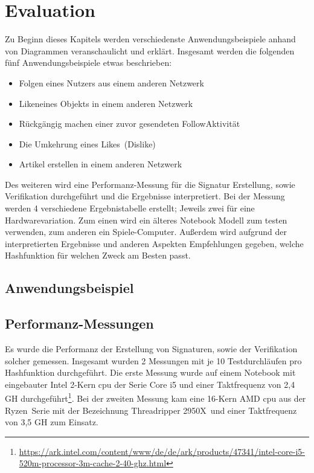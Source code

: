
\chapter{Evaluation}
\label{ch:Evaluation}
Zu Beginn dieses Kapitels werden verschiedenste Anwendungsbeispiele anhand von Diagrammen veranschaulicht und erklärt. Insgesamt werden die folgenden fünf Anwendungsbeispiele etwas beschrieben:
\begin{itemize}
	\item Folgen eines Nutzers aus einem anderen Netzwerk
	\item \glqq Liken\grqq eines Objekts in einem anderen Netzwerk
	\item Rückgängig machen einer zuvor gesendeten \glqq Follow\grqq Aktivität
	\item Die Umkehrung eines \glqq Likes\grqq~(Dislike)
	\item Artikel erstellen in einem anderen Netzwerk
\end{itemize}
Des weiteren wird eine Performanz-Messung für die Signatur Erstellung, sowie Verifikation durchgeführt und die Ergebnisse interpretiert. Bei der Messung werden 4 verschiedene Ergebnistabelle erstellt; Jeweils zwei für eine Hardwarevariation. Zum einen wird ein älteres Notebook Modell zum testen verwenden, zum anderen ein Spiele-Computer. Außerdem wird aufgrund der interpretierten Ergebnisse und anderen Aspekten Empfehlungen gegeben, welche Hashfunktion für welchen Zweck am Besten passt.
\section{Anwendungsbeispiel}
\section{Performanz-Messungen}
Es wurde die Performanz der Erstellung von Signaturen, sowie der Verifikation solcher gemessen. Insgesamt wurden 2 Messungen mit je 10 Testdurchläufen pro Hashfunktion durchgeführt. Die erste Messung wurde auf einem Notebook mit eingebauter Intel 2-Kern \gls{cpu} der Serie Core i5 und einer Taktfrequenz von 2,4 GH durchgeführt\footnote{\url{https://ark.intel.com/content/www/de/de/ark/products/47341/intel-core-i5-520m-processor-3m-cache-2-40-ghz.html}}. Bei der zweiten Messung kam eine 16-Kern AMD \gls{cpu} aus der \glqq Ryzen\grqq~Serie mit der Bezeichnung \glqq Threadripper 2950X\grqq~und einer Taktfrequenz von 3,5 GH zum Einsatz.\\

